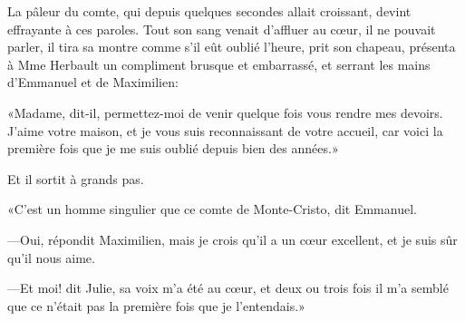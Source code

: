 La pâleur du comte, qui depuis quelques secondes allait croissant, devint effrayante à ces paroles. Tout son sang venait d'affluer au cœur, il ne pouvait parler, il tira sa montre comme s'il eût oublié l'heure, prit son chapeau, présenta à Mme Herbault un compliment brusque et embarrassé, et serrant les mains d'Emmanuel et de Maximilien: 

«Madame, dit-il, permettez-moi de venir quelque fois vous rendre mes devoirs. J'aime votre maison, et je vous suis reconnaissant de votre accueil, car voici la première fois que je me suis oublié depuis bien des années.» 

Et il sortit à grands pas. 

«C'est un homme singulier que ce comte de Monte-Cristo, dit Emmanuel. 

—Oui, répondit Maximilien, mais je crois qu'il a un cœur excellent, et je suis sûr qu'il nous aime. 

—Et moi! dit Julie, sa voix m'a été au cœur, et deux ou trois fois il m'a semblé que ce n'était pas la première fois que je l'entendais.» 